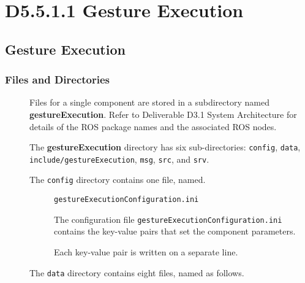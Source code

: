 \documentclass{CSSRforAfrica}
\newcommand{\checkboxChecked}{\fbox{\ding{51}}} %
\begin{document}
\newpage
\section{D5.5.1.1 Gesture Execution} 
\subsection{Gesture Execution} 
\label{subsection:gesture_execution}

\subsubsection{Files and Directories}
 
 \begin{description}
\item[\checkboxChecked] Files for a single component are stored in a subdirectory named \textbf{gestureExecution}. Refer to Deliverable D3.1 System Architecture for details of the ROS package names and the associated ROS nodes.

\item[\checkboxChecked] The \textbf{gestureExecution} directory has six sub-directories:  {\small \verb+config+},   {\small \verb+data+},   {\small \verb+include/gestureExecution+}, {\small \verb+msg+},  {\small \verb+src+}, and {\small \verb+srv+}.

\item[\checkboxChecked] The  {\small \verb+config+} directory contains one file, named.

\begin{description}
\item[\checkboxChecked] {\small \verb+gestureExecutionConfiguration.ini+}  
\item[\checkboxChecked] The configuration file {\small \verb+gestureExecutionConfiguration.ini+} contains the key-value pairs that set the component parameters.  
\item[\checkboxChecked] Each key-value pair is written on a separate line.
\end{description} 

\item[\checkboxChecked] The  {\small \verb+data+} directory contains eight files, named as follows.


\end{description}
\end{document}
